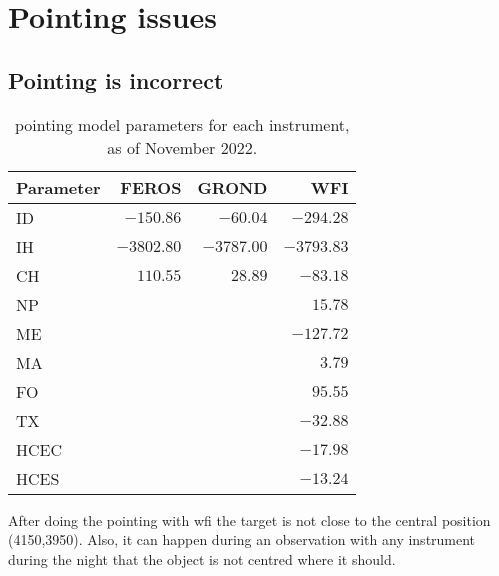 \documentclass[11pt,fleqn,a4paper]{book}
\begin{document}
\section{Pointing issues}

\subsection{Pointing is incorrect}
\label{sec:trouble:pointing}
\begin{table}[!bt]
\centering
\caption[Pointing model parameters for each instrument]{\Gls{pointing model} parameters for each instrument, as of November 2022.}
\label{tab:pointingmodelcoeff}
\small
\begin{tabular}{lrrr}
\hline\hline
Parameter & FEROS      & GROND     & WFI\\\hline
ID        & $-150.86$  & $-60.04$ & $-294.28$\\
IH        & $-3802.80$  & $-3787.00$ & $-3793.83$\\
CH        & $ 110.55$  & $28.89$ & $ -83.18$\\\hline
NP        & \multicolumn{3}{r}{$15.78$}\\
ME        & \multicolumn{3}{r}{$-127.72$}\\
MA        & \multicolumn{3}{r}{$3.79$}\\
FO        & \multicolumn{3}{r}{$95.55$}\\
TX        & \multicolumn{3}{r}{$-32.88$}\\
HCEC      & \multicolumn{3}{r}{$-17.98$}\\
HCES      & \multicolumn{3}{r}{$-13.24$}\\\hline
\end{tabular}
\end{table}

After doing the \gls{pointing} with \gls{wfi} the target is not close to the central position (4150,3950).  Also, it can happen during an observation with any instrument during the night that the object is not centred where it should.
\end{document}

